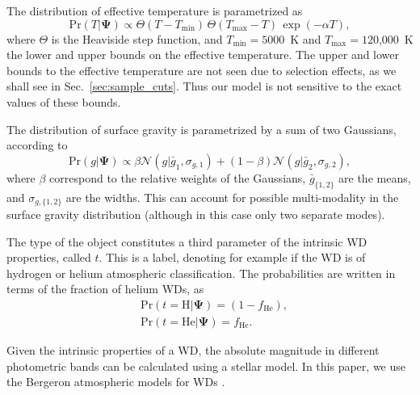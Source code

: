 \documentclass[fleqn,usenatbib]{mnras}
\newcommand{\popp}{\boldsymbol{\Psi}}
\newcommand{\Teff}{T}
\newcommand{\logg}{g}
\newcommand{\pr}{\text{Pr}}
\begin{document}
The distribution of effective temperature is parametrized as
\begin{equation}\label{eq:T}
    \pr(\Teff | \popp) \propto \Theta(\Teff - \Teff_\text{min})\, \Theta(\Teff_\text{max} - \Teff) \, \exp (-\alpha \Teff),
\end{equation}
where $\Theta$ is the Heaviside step function, and $\Teff_\text{min}=5000$~K and $\Teff_\text{max}=120$,000~K the lower and upper bounds on the effective temperature. The upper and lower bounds to the effective temperature are not seen due to selection effects, as we shall see in Sec.~\ref{sec:sample_cuts}. Thus our model is not sensitive to the exact values of these bounds.

The distribution of surface gravity is parametrized by a sum of two Gaussians, according to
\begin{equation}\label{eq:T&g}
    \pr(\logg | \popp) \propto \beta \mathcal{N}(\logg | \bar{g}_1, \sigma_{g,1}) +
    (1-\beta) \mathcal{N}(\logg | \bar{g}_2, \sigma_{g,2}),
\end{equation}
where $\beta$ correspond to the relative weights of the Gaussians, $\bar{g}_{\{1,2\}}$ are the means, and $\sigma_{g,\{1,2\}}$ are the widths. This can account for possible multi-modality in the surface gravity distribution (although in this case only two separate modes).

The type of the object constitutes a third parameter of the intrinsic WD properties, called $t$. This is a label, denoting for example if the WD is of hydrogen or helium atmospheric classification. The probabilities are written in terms of the fraction of helium WDs, as
\begin{equation}\label{eq:DADB}
\begin{split}
	& \pr(t=\text{H} | \popp) = (1-f_\text{He}),\\
	& \pr(t=\text{He} | \popp) = f_\text{He}.
\end{split}
\end{equation}

Given the intrinsic properties of a WD, the absolute magnitude in different photometric bands can be calculated using a stellar model. In this paper, we use the Bergeron atmospheric models for WDs \citep{Bergeron:1995we,Finley:1997zz,Bergeron:2000ce,2001PASP..113..409F}.
\end{document}
